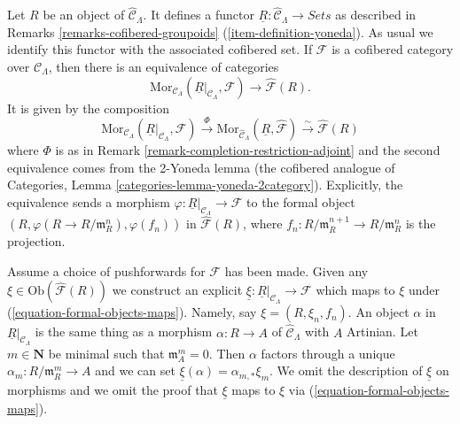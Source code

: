 \begin{remark}
\label{remark-formal-objects-yoneda}
Let $R$ be an object of $\widehat{\mathcal{C}}_\Lambda$.  It defines a functor 
$\underline{R}: \widehat{\mathcal{C}}_\Lambda \to \textit{Sets}$ 
as described in
Remarks \ref{remarks-cofibered-groupoids} (\ref{item-definition-yoneda}).
As usual we identify this functor with the 
associated cofibered set.  If $\mathcal{F}$ is a cofibered category over 
$\mathcal{C}_\Lambda$, then there is an equivalence of categories
\begin{equation}
\label{equation-formal-objects-maps}
\text{Mor}_{\mathcal{C}_\Lambda}(
\underline{R}|_{\mathcal{C}_\Lambda}, \mathcal{F}) 
\longrightarrow
\widehat{\mathcal{F}}(R).
\end{equation}
It is given by the composition
$$
\text{Mor}_{\mathcal{C}_\Lambda}(
\underline{R}|_{\mathcal{C}_\Lambda}, \mathcal{F}) 
\xrightarrow{\Phi}
\text{Mor}_{\widehat{\mathcal{C}}_\Lambda}(
\underline{R}, \widehat{\mathcal{F}}) 
\xrightarrow{\sim}
\widehat{\mathcal{F}}(R)
$$
where $\Phi$ is as in
Remark \ref{remark-completion-restriction-adjoint}
and the second equivalence comes from the 2-Yoneda lemma
(the cofibered analogue of 
Categories, Lemma \ref{categories-lemma-yoneda-2category}).
Explicitly, the equivalence sends a morphism
$\varphi: \underline{R}|_{\mathcal{C}_\Lambda} \to \mathcal{F}$
to the formal object
$(R, \varphi(R \to R/\mathfrak{m}_R^n), \varphi(f_n))$ in
$\widehat{\mathcal{F}}(R)$, where
$f_n : R/\mathfrak m_R^{n + 1} \to R/\mathfrak m_R^n$ is the projection.  

\medskip\noindent
Assume a choice of pushforwards for $\mathcal{F}$ has been made.
Given any $\xi \in \text{Ob}(\widehat{\mathcal{F}}(R))$ we construct
an explicit
$\underline{\xi} : \underline{R}|_{\mathcal{C}_\Lambda} \to \mathcal{F}$
which maps to $\xi$ under (\ref{equation-formal-objects-maps}).
Namely, say $\xi = (R, \xi_n, f_n)$. An object $\alpha$ in
$\underline{R}|_{\mathcal{C}_\Lambda}$ is the same thing as a morphism
$\alpha : R \to A$ of $\widehat{\mathcal{C}}_\Lambda$ with $A$
Artinian. Let $m \in \mathbf{N}$ be minimal such that $\mathfrak m_A^m = 0$.
Then $\alpha$ factors through a unique $\alpha_m : R/\mathfrak m_R^m \to A$
and we can set $\underline{\xi}(\alpha) = \alpha_{m, *}\xi_m$.
We omit the description of $\underline{\xi}$ on morphisms and we
omit the proof that $\underline{\xi}$ maps to $\xi$
via (\ref{equation-formal-objects-maps}).


\end{remark}

